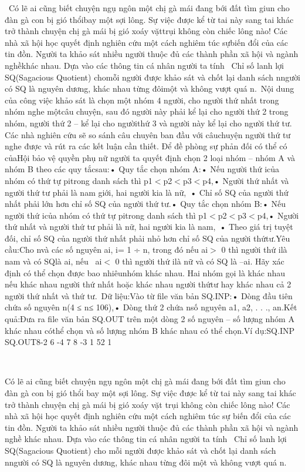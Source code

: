 

 Có lẽ ai cũng biết chuyện ngụ ngôn một chị gà mái đang bới đất tìm giun cho đàn gà con bị gió thổibay một sợi lông. Sự việc được kể từ tai này sang tai khác trở thành chuyện chị gà mái bị gió xoáy vặttrụi không còn chiếc lông nào! Các nhà xã hội học quyết định nghiên cứu một cách nghiêm túc sựbiến đổi của các tin đồn. Người ta khảo sát nhiều người thuộc đủ các thành phần xã hội và ngành nghềkhác nhau. Dựa vào các thông tin cá nhân người ta tính  Chỉ số lanh lợi SQ(Sagacious Quotient) chomỗi người được khảo sát và chốt lại danh sách nngười có SQ là nguyên dương, khác nhau từng đôimột và không vượt quá n. Nội dung của công việc khảo sát là chọn một nhóm 4 người, cho người thứ nhất trong nhóm nghe mộtcâu chuyện, sau đó người này phải kể lại cho người thứ 2 trong nhóm, người thứ 2 – kể lại cho ngườithứ 3 và người này kể lại cho người thứ tư. Các nhà nghiên cứu sẽ so sánh câu chuyên ban đầu với câuchuyện người thứ tư nghe được và rút ra các kết luận cần thiết. Để đề phòng sự phản đối có thể có củaHội bảo vệ quyền phụ nữ người ta quyết định chọn 2 loại nhóm – nhóm A và nhóm B theo các quy tắcsau:• Quy tắc chọn nhóm A:• Nếu người thứ icủa nhóm có thứ tự pitrong danh sách thì p1$<$p2$<$p3$<$p4,• Người thứ nhất và người thứ tư phải là nam giới, hai người kia là nữ, • Chỉ số SQ của người thứ nhất phải lớn hơn chỉ số SQ của người thứ tư.• Quy tắc chọn nhóm B:• Nếu người thứ icủa nhóm có thứ tự pitrong danh sách thì p1$<$p2$<$p3$<$p4,• Người thứ nhất và người thứ tư phải là nữ, hai người kia là nam, • Theo giá trị tuyệt đối, chỉ số SQ của người thứ nhất phải nhỏ hơn chỉ số SQ của người thứtư.Yêu cầu:Cho nvà các số nguyên ai, i= 1 ÷ n, trong đó nếu ai$>$ 0 thì người thứ ilà nam và có SQlà ai, nếu  ai$<$ 0 thì người thứ ilà nữ và có SQ là –ai. Hãy xác định có thể chọn được bao nhiêunhóm khác nhau. Hai nhóm gọi là khác nhau nếu khác nhau người thứ nhất hoặc khác nhau người thứtư hay khác nhau cả 2 người thứ nhất và thứ tư. Dữ liệu:Vào từ file văn bản SQ.INP:• Dòng đầu tiên chứa số nguyên n(4 ≤ n≤ 106),• Dòng thứ 2 chứa nsố nguyên a1, a2, . . ., an.Kết quả:Đưa ra file văn bản SQ.OUT trên một dòng 2 số nguyên – số lượng nhóm A khác nhau cóthể chọn và số lượng nhóm B khác nhau có thể chọn.Ví dụ:SQ.INP SQ.OUT8-2 6 -4 7 8 -3 1 52 1

 

Có lẽ ai cũng biết chuyện ngụ ngôn một chị gà mái đang bới đất tìm giun cho đàn gà con bị gió thổi bay một sợi lông. Sự việc được kể từ tai này sang tai khác trở thành chuyện chị gà mái bị gió xoáy vặt trụi không còn chiếc lông nào! Các nhà xã hội học quyết định nghiên cứu một cách nghiêm túc sự biến đổi của các tin đồn. Người ta khảo sát nhiều người thuộc đủ các thành phần xã hội và ngành nghề khác nhau. Dựa vào các thông tin cá nhân người ta tính  Chỉ số lanh lợi SQ(Sagacious Quotient) cho mỗi người được khảo sát và chốt lại danh sách nngười có SQ là nguyên dương, khác nhau từng đôi một và không vượt quá n. 

